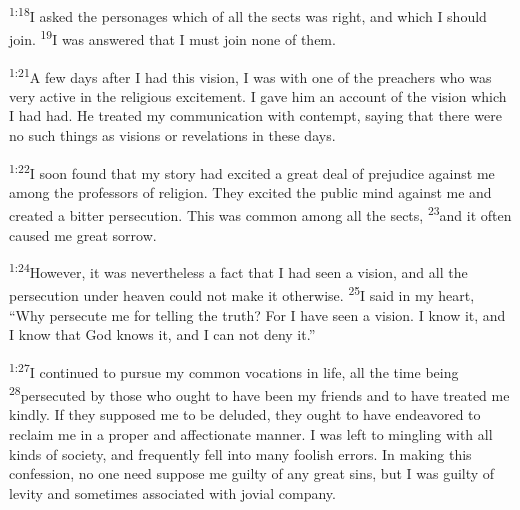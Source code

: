 \documentclass[openany,12pt,english]{book}
\newenvironment{para}{\par\pretolerance=100\tolerance=200\setlength{\emergencystretch}{0.6em}\relax}{\par}
\begin{document}
\begin{para}
    \textsuperscript{1:18}\thinspace{}I asked the personages which of all the sects was right, and which I should join.
    \textsuperscript{19}\thinspace{}I was answered that I must join none of them.
\end{para}

\bigskip{}

\begin{para}
    \textsuperscript{1:21}\thinspace{}A few days af\-ter I had this vi\-sion, I was with one of the preachers who was ver\-y ac\-tive in the re\-li\-gious ex\-cite\-ment. I gave him an ac\-count of the vi\-sion which I had had. He treated my com\-mu\-ni\-ca\-tion with con\-tempt, say\-ing that there were no such things as visions or revelations in these days.
\end{para}

\begin{para}
    \textsuperscript{1:22}\thinspace{}I soon found that my sto\-ry had ex\-cit\-ed a great deal of prej\-u\-dice against me a\-mong the professors of re\-li\-gion. They ex\-cit\-ed the pub\-lic mind against me and cre\-at\-ed a bit\-ter per\-se\-cu\-tion. This was com\-mon a\-mong all the sects,
    \textsuperscript{23}\thinspace{}and it of\-ten caused me great sor\-row.
\end{para}

\begin{para}
    \textsuperscript{1:24}\thinspace{}How\-ev\-er, it was nev\-er\-the\-less a fact that I had seen a vi\-sion, and all the per\-se\-cu\-tion un\-der heav\-en could not make it oth\-er\-wise.
    \textsuperscript{25}\thinspace{}I said in my heart, “Why per\-se\-cute me for tell\-ing the truth? For I have seen a vi\-sion. I know it, and I know that God knows it, and I can not de\-ny it.”
\end{para}

\bigskip{}

\begin{para}
    \textsuperscript{1:27}\thinspace{}I con\-tin\-ued to pur\-sue my com\-mon vocations in life, all the time be\-ing
    \textsuperscript{28}\thinspace{}per\-se\-cut\-ed by those who ought to have been my friends and to have treated me kind\-ly. If they sup\-posed me to be de\-lud\-ed, they ought to have endeavored to re\-claim me in a prop\-er and af\-fec\-tion\-ate man\-ner. I was left to mingling with all kinds of so\-ci\-e\-ty, and fre\-quent\-ly fell in\-to man\-y fool\-ish errors. In mak\-ing this con\-fes\-sion, no one need sup\-pose me guilt\-y of any great sins, but I was guilt\-y of lev\-i\-ty and some\-times as\-so\-ci\-at\-ed with jo\-vi\-al com\-pa\-ny.
\end{para}
\end{document}
